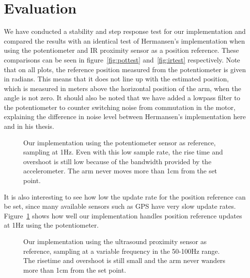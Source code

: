 \begin{figure*}
	\centering
	\subfloat[][]{\setlength\figureheight{4cm}
		\setlength\figurewidth{6cm}
		
	}
	\subfloat[][]{\setlength\figureheight{4cm}
		\setlength\figurewidth{6cm}
		
	}
	\caption{(a): Our implementation using the IR proximity sensor as reference, sampling at \(\sim\)20Hz versus (b): 
	Hermansens's implementation using the IR proximity sensor as reference, sampling at 200Hz. For (a) the slow variations in 
altitude are a result of the measurements from the IR proximity sensor being
quantized in \(\sim\)2cm steps giving the arm free reign to drift within that
range.
The noise in (b) is not measurement noise, but rapid oscillation.}
\label{fig:irtest}
\vspace{3pt}
\hrulefill
\end{figure*}
\section{Evaluation}\label{sec:evaluation}
We have conducted a stability and step response test for our implementation and compared the results with an identical test of
Hermansen's implementation when using the potentiometer and IR proximity sensor as a position reference. These comparisons can be
seen in figure~\ref{fig:pottest} and~\ref{fig:irtest} respectively. Note that on all plots, the reference position measured from the
potentiometer is given in radians. This means that it does not line up with the estimated position, which is measured in meters above
the horizontal position of the arm, when the angle is not zero. It should also be noted that we have added a lowpass filter to the
potentiometer to counter switching noise from commutation in the motor,
explaining the difference in noise level between Hermansen's implementation here and in his thesis.
\begin{figure}
	\setlength\figureheight{4cm}
	\setlength\figurewidth{6cm}
	
	\caption{Our implementation using the potentiometer sensor as reference, sampling at 1Hz. Even with this low sample rate, the
		rise time and overshoot is still low because of the bandwidth provided by the accelerometer. The arm never moves more than
		1cm from the set point.}
\label{fig:pot1hztest}
\end{figure}

It is also interesting to see how low the update rate for the position reference can be set, since many available sensors such as GPS 
have very slow update rates. Figure~\ref{fig:pot1hztest} shows how well our implementation handles position reference updates at
1Hz using the potentiometer.
\begin{figure}
	\setlength\figureheight{4cm}
	\setlength\figurewidth{6cm}
	
	\caption{Our implementation using the ultrasound proximity sensor as reference, sampling at a variable frequency in the 50-100Hz 
	range. The risetime and overshoot is still small and the arm never wanders more than 1cm from the set point.}
\label{fig:ultratest}
\end{figure}


